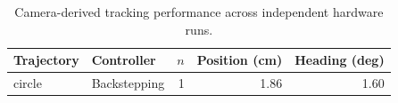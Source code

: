 \begin{table}[!t]
\centering
\caption{Camera-derived tracking performance across independent hardware runs.}
\label{tab:tracking}
\begin{tabular}{llrrr}
\hline
Trajectory & Controller & $n$ & Position (cm) & Heading (deg) \\
\hline
circle & Backstepping & 1 & 1.86 & 1.60 \\
\hline
\end{tabular}
\end{table}
